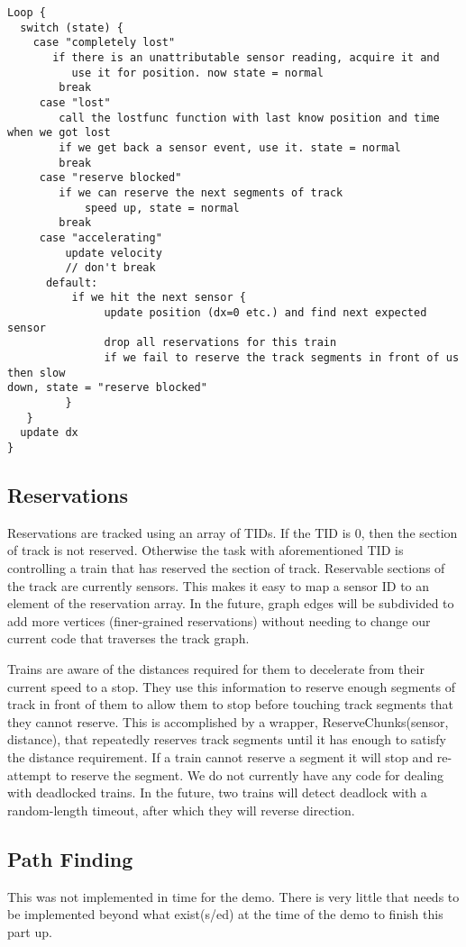 \documentclass{article}
\begin{document}
\begin{verbatim}
Loop {
  switch (state) {
    case "completely lost"
       if there is an unattributable sensor reading, acquire it and
          use it for position. now state = normal
        break
     case "lost"
        call the lostfunc function with last know position and time when we got lost
        if we get back a sensor event, use it. state = normal
        break
     case "reserve blocked"
        if we can reserve the next segments of track
            speed up, state = normal
        break
     case "accelerating"
         update velocity
         // don't break
      default:
          if we hit the next sensor {
               update position (dx=0 etc.) and find next expected sensor
               drop all reservations for this train
               if we fail to reserve the track segments in front of us then slow
down, state = "reserve blocked"
         }
   }        
  update dx
}
\end{verbatim}

\subsection{Reservations}
Reservations are tracked using an array of TIDs. If the TID is 0, then the
section of track is not reserved. Otherwise the task with aforementioned TID is
controlling a train that has reserved the section of track. Reservable sections
of the track are currently sensors. This makes it easy to map a sensor ID to an
element of the reservation array. In the future, graph edges will be subdivided
to add more vertices (finer-grained reservations) without needing to change our
current code that traverses the track graph.

Trains are aware of the distances required for them to decelerate from their
current speed to a stop. They use this information to reserve enough segments of
track in front of them to allow them to stop before touching track segments that
they cannot reserve.  This is accomplished by a wrapper, ReserveChunks(sensor,
distance), that repeatedly reserves track segments until it has enough to
satisfy the distance requirement. If a train cannot reserve a segment it will
stop and re-attempt to reserve the segment. We do not currently have any code
for dealing with deadlocked trains. In the future, two trains will detect
deadlock with a random-length timeout, after which they will reverse direction.

\subsection{Path Finding}
This was not implemented in time for the demo. There is very little that needs
to be implemented beyond what exist(s/ed) at the time of the demo to finish this
part up.
\end{document}
